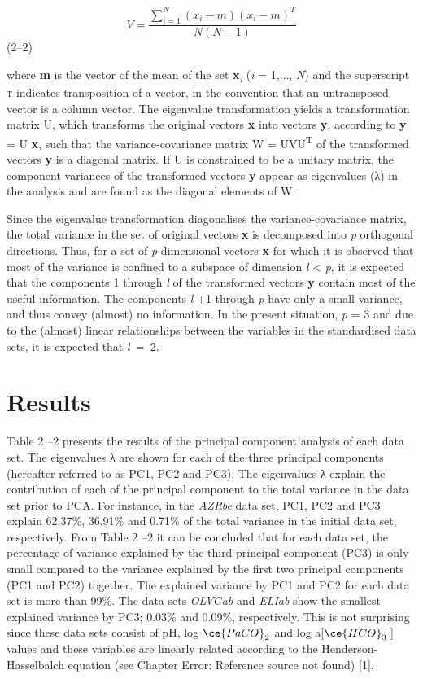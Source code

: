 \documentclass[
  12pt,
  a4paperpaper,
]{report}
\begin{document}
\[V = \frac{\sum_{i = 1}^{N}{(x_{i} - m)(x_{i} - m)^{T}}}{N(N - 1)}\]
(2--2)

where \textbf{m} is the vector of the mean of the set
\textbf{x}\emph{\textsubscript{i}} (\emph{i} = 1,..., \emph{N}) and the
superscript \textsc{t} indicates transposition of a vector, in the
convention that an untransposed vector is a column vector. The
eigenvalue transformation yields a transformation matrix U, which
transforms the original vectors \textbf{x} into vectors \textbf{y},
according to \textbf{y} = U \textbf{x}, such that the
variance-covariance matrix W = UVU\textsuperscript{T} of the transformed
vectors \textbf{y} is a diagonal matrix. If U is constrained to be a
unitary matrix, the component variances of the transformed vectors
\textbf{y} appear as eigenvalues (λ) in the analysis and are found as
the diagonal elements of W.

Since the eigenvalue transformation diagonalises the variance-covariance
matrix, the total variance in the set of original vectors \textbf{x} is
decomposed into \emph{p} orthogonal directions. Thus, for a set of
\emph{p}-dimensional vectors \textbf{x} for which it is observed that
most of the variance is confined to a subspace of dimension \emph{l}
\textless{} \emph{p}, it is expected that the components 1 through
\emph{l} of the transformed vectors \textbf{y} contain most of the
useful information. The components \emph{l} +1 through \emph{p} have
only a small variance, and thus convey (almost) no information. In the
present situation, \emph{p} = 3 and due to the (almost) linear
relationships between the variables in the standardised data sets, it is
expected that \emph{l~}=~2.

\hypertarget{results}{%
\section{Results}\label{results}}

Table 2 --2 presents the results of the principal component analysis of
each data set. The eigenvalues λ are shown for each of the three
principal components (hereafter referred to as PC1, PC2 and PC3). The
eigenvalues λ explain the contribution of each of the principal
component to the total variance in the data set prior to PCA. For
instance, in the \emph{AZRbe} data set, PC1, PC2 and PC3 explain
62.37\%, 36.91\% and 0.71\% of the total variance in the initial data
set, respectively. From Table 2 --2 it can be concluded that for each
data set, the percentage of variance explained by the third principal
component (PC3) is only small compared to the variance explained by the
first two principal components (PC1 and PC2) together. The explained
variance by PC1 and PC2 for each data set is more than 99\%. The data
sets \emph{OLVGab} and \emph{ELIab} show the smallest explained variance
by PC3; 0.03\% and 0.09\%, respectively. This is not surprising since
these data sets consist of pH, log \(\ce{PaCO}_{2}\) and log
a{[}\(\ce{HCO}_{3}^{-}\){]} values and these variables are linearly
related according to the Henderson-Hasselbalch equation (see Chapter
Error: Reference source not found) {[}1{]}.
\end{document}
